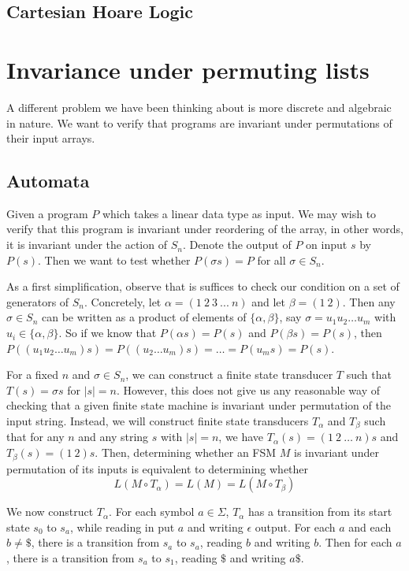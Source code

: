 \documentclass{llncs}
\begin{document}
\subsection{Cartesian Hoare Logic}

\section{Invariance under permuting lists}
\label{permlists}

A different problem we have been thinking about is more discrete
and algebraic in nature.
We want to verify that programs are invariant under
permutations of their input arrays.

\subsection{Automata}
Given a program $P$ which takes a linear data type
as input. We may wish to verify that this program
is invariant under reordering of the array,
in other words, it is invariant under the action of $S_n$.
Denote the output of $P$ on input $s$ by $P(s)$.
Then we want to test whether $P(\sigma s) = P$
for all $\sigma \in S_n$.

As a first simplification, observe that is
suffices to check our condition on a set
of generators of $S_n$.
Concretely, let $\alpha = (1\ 2\ 3\ ...\ n)$
and let $\beta = (1\ 2)$.
Then any $\sigma \in S_n$ can be written as
a product of elements of $\{\alpha,\beta\}$,
say $\sigma = u_1 u_2\ldots u_m$ with
$u_i \in \{\alpha,\beta\}$.
So if we know that $P(\alpha s) = P(s)$
and $P(\beta s) = P(s)$, then
$P((u_1 u_2 \ldots u_m)s)
= P((u_2 \ldots u_m)s)
= \ldots = P(u_ms) = P(s) $.

For a fixed $n$ and $\sigma \in S_n$,
we can construct a finite state transducer
$T$ such that $T(s) = \sigma s$ for $|s|=n$.
However, this does not give us any
reasonable way of checking that a given
finite state machine is invariant under permutation
of the input string.
Instead, we will construct finite state
transducers $T_{\alpha}$ and $T_{\beta}$
such that for any $n$ and any string $s$
with $|s|=n$, we have
$T_{\alpha}(s)=(1\ 2\ \ldots\ n) s$ and
$T_{\beta}(s) = (1\ 2) s$.
Then, determining whether an FSM $M$ is
invariant under permutation of its inputs
is equivalent to determining whether
\[
  L(M \circ T_\alpha) = L(M) = L(M \circ T_\beta)
\]

We now construct $T_\alpha$.
For each symbol $a \in \Sigma$,
$T_\alpha$ has a transition from its start
state $s_0$ to $s_a$, while reading in put $a$ and
writing $\epsilon$ output.
For each $a$ and each $b\ne \$$, there is a
transition from $s_a$ to $s_a$, reading $b$
and writing $b$.
Then for each $a$, there is a transition from
$s_a$ to $s_1$, reading $\$$ and writing $a\$$.
\end{document}
